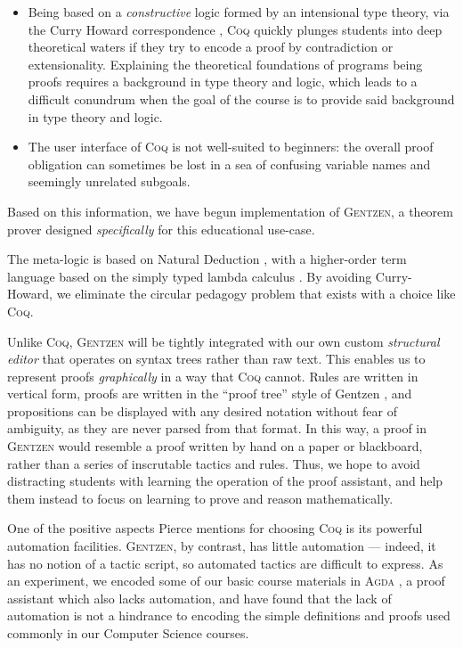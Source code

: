 \documentclass[a4paper]{jfp}
\begin{document}
\begin{itemize}
\item Being
        based on a \emph{constructive} logic formed by an intensional type theory, via the Curry Howard
        correspondence \cite{Howard:1980vs}, \textsc{Coq} quickly plunges students into deep theoretical waters if they try to encode
a proof by contradiction or extensionality. Explaining the theoretical foundations of programs being
proofs requires a background in type theory and logic, which leads to a difficult conundrum when the
goal of the course is to provide said background in type theory and logic.

\item The user interface of \textsc{Coq} is not well-suited to beginners: the overall proof obligation can
        sometimes be lost in a sea of confusing variable names and seemingly unrelated subgoals.
\end{itemize}

Based on this information, we have begun implementation of \textsc{Gentzen}, a theorem prover designed
\emph{specifically} for this educational use-case.

The meta-logic is based on Natural Deduction \cite{citeulike:869771}, with a higher-order term
language based on the simply typed lambda calculus \cite{citeulike:808758}. By avoiding Curry-Howard, we eliminate the circular pedagogy
problem that exists with a choice like \textsc{Coq}.

Unlike \textsc{Coq}, \textsc{Gentzen} will be tightly integrated with our own custom
\emph{structural editor} that operates on syntax trees rather than raw text.
This enables us to represent proofs \emph{graphically} in a way that
\textsc{Coq} cannot. Rules are written in vertical form, proofs are written in
the ``proof tree'' style of Gentzen \cite{citeulike:869771}, and propositions can be displayed
with any desired notation without fear of ambiguity, as they are never parsed
from that format. In this way, a proof in \textsc{Gentzen} would resemble a
proof written by hand on a paper or blackboard, rather than a series of
inscrutable tactics and rules. Thus, we hope to avoid distracting students with
learning the operation of the proof assistant, and help them instead to focus
on learning to prove and reason mathematically.

One of the positive aspects Pierce mentions for choosing \textsc{Coq} is its
powerful automation facilities. \textsc{Gentzen}, by contrast, has little
automation --- indeed, it has no notion of a tactic script, so automated
tactics are difficult to express. As an experiment, we encoded some of our
basic course materials in \textsc{Agda} \cite{conf/afp/norell08}, a proof assistant which also
lacks automation, and have found that the lack of automation is not a hindrance
to encoding the simple definitions and proofs used commonly in our Computer
Science courses.
\end{document}
